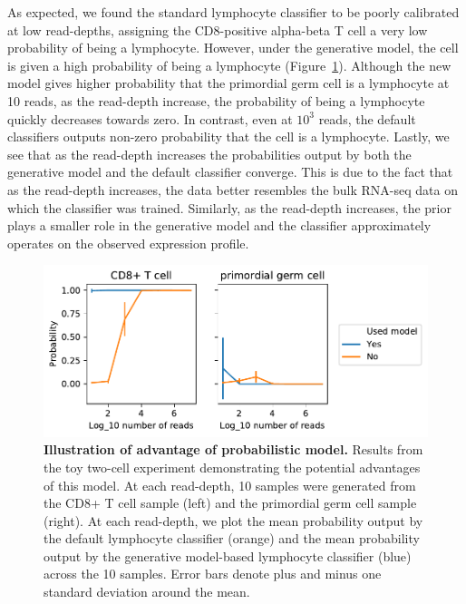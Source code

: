 As expected, we found the standard lymphocyte classifier to be poorly calibrated at low read-depths, assigning the CD8-positive alpha-beta T cell a very low probability of being a lymphocyte. However, under the generative model, the cell is given a high probability of being a lymphocyte (Figure~\ref{fig:sc_model_toy_experiment}).   Although the new model gives higher probability that the primordial germ cell is a lymphocyte at 10 reads, as the read-depth increase, the probability of being a lymphocyte quickly decreases towards zero. In contrast, even at $10^3$ reads, the default classifiers outputs non-zero probability that the cell is a lymphocyte. Lastly, we see that as the read-depth increases the probabilities output by both the generative model and the default classifier converge.  This is due to the fact that as the read-depth increases, the data better resembles the bulk RNA-seq data on which the classifier was trained. Similarly, as the read-depth increases, the prior plays a smaller role in the generative model and the classifier approximately operates on the observed expression profile.  
       
 \begin{figure}[h!]
      \centerline{\includegraphics[width=13cm]{figures/downsample_apply_sc_model.pdf}}
      \caption{\textbf{Illustration of advantage of probabilistic model.} Results from the toy two-cell experiment demonstrating the potential advantages of this model. At each read-depth, 10 samples were generated from the CD8+ T cell sample (left) and the primordial germ cell sample (right).  At each read-depth, we plot the mean probability output by the default lymphocyte classifier (orange) and the mean probability output by the generative model-based lymphocyte classifier (blue) across the 10 samples. Error bars denote plus and minus one standard deviation around the mean.}
      \label{fig:sc_model_toy_experiment}
      \end{figure}
      
